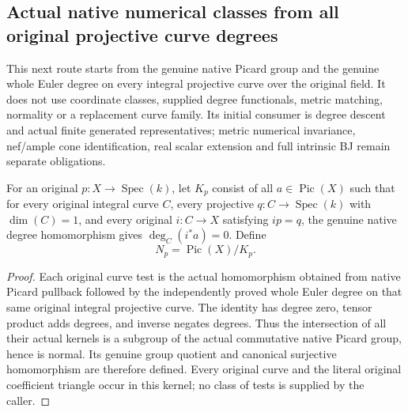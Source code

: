 \subsection{Actual native numerical classes from all original projective curve degrees}
This next route starts from the genuine native Picard group and the genuine
whole Euler degree on every integral projective curve over the original
field. It does not use coordinate classes, supplied degree functionals,
metric matching, normality or a replacement curve family. Its initial
consumer is degree descent and actual finite generated representatives;
metric numerical invariance, nef/ample cone identification, real scalar
extension and full intrinsic BJ remain separate obligations.

\begin{definition}
\label{def:seven-native-curve-numerical-quotient}

For an original $p:X\to\operatorname{Spec}(k)$, let $K_p$ consist of all
$a\in\operatorname{Pic}(X)$ such that for every original integral curve
$C$, every projective $q:C\to\operatorname{Spec}(k)$ with
$\dim(C)=1$, and every original $i:C\to X$ satisfying $ip=q$, the genuine
native degree homomorphism gives $\deg_C(i^*a)=0$. Define
\[
 N_p=\operatorname{Pic}(X)/K_p.
\]
\end{definition}
\begin{proof}
Each original curve test is the actual homomorphism obtained from native
Picard pullback followed by the independently proved whole Euler degree
on that same original integral projective curve. The identity has degree
zero, tensor product adds degrees, and inverse negates degrees. Thus the
intersection of all their actual kernels is a subgroup of the actual
commutative native Picard group, hence is normal. Its genuine group
quotient and canonical surjective homomorphism are therefore defined.
Every original curve and the literal original coefficient triangle occur
in this kernel; no class of tests is supplied by the caller.
\end{proof}

